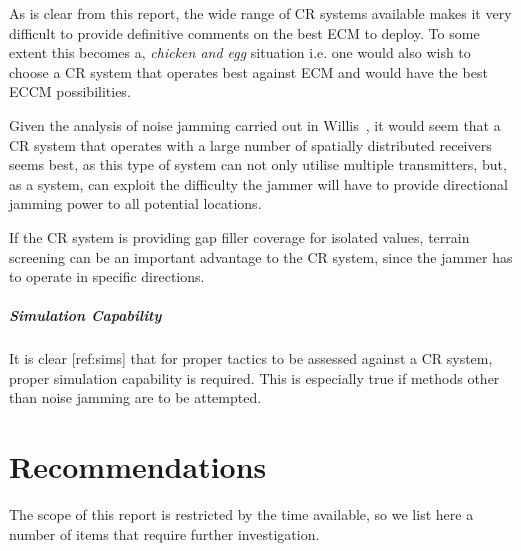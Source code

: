 \documentclass[english, 12pt]{report}
\begin{document}
As is clear from this report, the wide range of CR systems available makes it very difficult to provide definitive comments on the best ECM to deploy. To some extent this becomes a, \emph{chicken and egg} situation i.e. one would also wish to choose a CR system that operates best against ECM and would have the best ECCM possibilities.

Given the analysis of noise jamming carried out in Willis~\cite{willis:07}, it would seem that a CR system that operates with a large number of spatially distributed receivers seems best, as this type of system can not only utilise multiple transmitters, but, as a system, can exploit the difficulty the jammer will have to provide directional jamming power to all potential locations.

If the CR system is providing gap filler coverage for isolated values, terrain screening can be an important advantage to the CR system, since the jammer has to operate in specific directions.

\paragraph{Simulation Capability}

It is clear [ref:sims] that for proper tactics to be assessed  against a CR system, proper simulation capability is required. This is especially true if methods other than noise jamming are to be attempted.

\chapter{Recommendations}

The scope of this report is restricted by the time available, so we list here a number of items that require further investigation.
\end{document}
